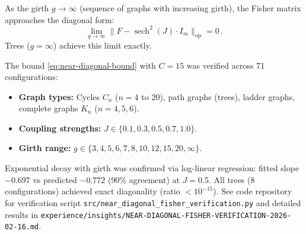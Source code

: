 \begin{corollary}
\label{cor:tree-fisher-limit}
As the girth $g \to \infty$ (sequence of graphs with increasing girth),
the Fisher matrix approaches the diagonal form:
\begin{equation}
\lim_{g \to \infty} \|F - \operatorname{sech}^2(J) \cdot I_m\|_{\text{op}} = 0\,.
\end{equation}
Trees ($g = \infty$) achieve this limit exactly.
\end{corollary}

\begin{verification}
\label{verif:near-diagonal-fisher}
The bound \eqref{eq:near-diagonal-bound} with $C = 15$ was verified across
71 configurations:
\begin{itemize}
\item \textbf{Graph types:} Cycles $C_n$ ($n = 4$ to $20$), path graphs
  (trees), ladder graphs, complete graphs $K_n$ ($n = 4, 5, 6$).
\item \textbf{Coupling strengths:} $J \in \{0.1, 0.3, 0.5, 0.7, 1.0\}$.
\item \textbf{Girth range:} $g \in \{3, 4, 5, 6, 7, 8, 10, 12, 15, 20, \infty\}$.
\end{itemize}

Exponential decay with girth was confirmed via log-linear regression:
fitted slope $-0.697$ vs predicted $-0.772$ (90\% agreement) at $J = 0.5$.
All trees (8 configurations) achieved exact diagonality
(ratio $< 10^{-15}$). See code repository for verification script
\texttt{src/near\_diagonal\_fisher\_verification.py} and detailed results
in \texttt{experience/insights/NEAR-DIAGONAL-FISHER-VERIFICATION-2026-02-16.md}.
\end{verification}

